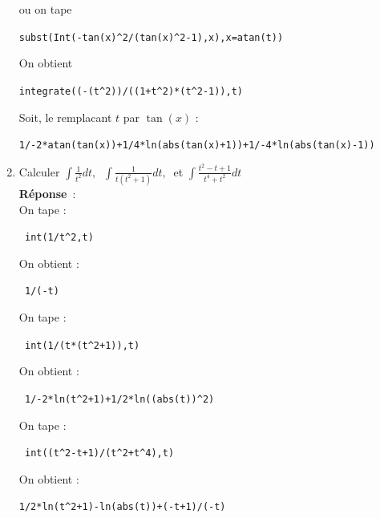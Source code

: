 \documentclass{article}
\begin{document}
\begin{giacjshere}
\begin{enumerate}
ou on tape
\begin{center}
\verb|subst(Int(-tan(x)^2/(tan(x)^2-1),x),x=atan(t))|
\end{center}
On obtient 
\begin{center}
\verb|integrate((-(t^2))/((1+t^2)*(t^2-1)),t)|
\end{center}
Soit, le remplacant $t$ par $\tan(x)$ :
\begin{center}
\verb|1/-2*atan(tan(x))+1/4*ln(abs(tan(x)+1))+1/-4*ln(abs(tan(x)-1))|
\end{center}
\item  Calculer $\displaystyle\int \frac{1}{t^2}dt,\ $ 
$\displaystyle\int \frac{1}{t(t^2+1)}dt,\ $ et
$\displaystyle\int \frac{t^2-t+1}{t^4+t^2}dt$\\
{\bf R\'eponse}~:\\
On tape :
\begin{center}
\verb| int(1/t^2,t)|
\end{center}
On obtient :
\begin{center}
\verb| 1/(-t)|
\end{center}
On tape :
\begin{center}
\verb| int(1/(t*(t^2+1)),t)|
\end{center}
On obtient :
\begin{center}
\verb| 1/-2*ln(t^2+1)+1/2*ln((abs(t))^2)|
\end{center}
On tape :
\begin{center}
\verb| int((t^2-t+1)/(t^2+t^4),t)|
\end{center}
On obtient :
\begin{center}
\verb|1/2*ln(t^2+1)-ln(abs(t))+(-t+1)/(-t)|
\end{center}
\end{enumerate}


\end{giacjshere}
\end{document}
